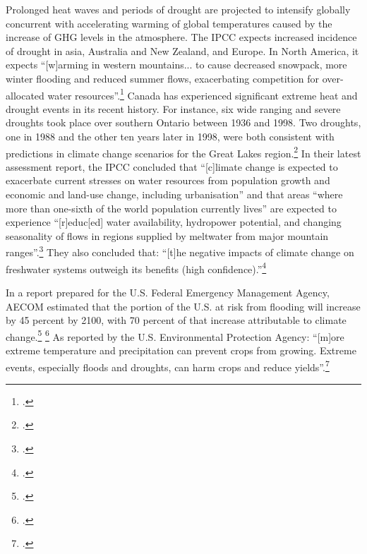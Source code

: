 Prolonged heat waves and periods of drought are projected to intensify globally concurrent with accelerating warming of global temperatures caused by the increase of GHG levels in the atmosphere.
The IPCC expects increased incidence of drought in asia, Australia and New Zealand, and Europe.
In North America, it expects ``[w]arming in western mountains... to cause decreased snowpack, more winter flooding and reduced summer flows, exacerbating competition for over-allocated water resources''.\footcite[][See: Synthesis report, Table SPM.2. Examples of some projected regional impacts. \url{https://www.ipcc.ch/publications_and_data/ar4/syr/en/spms3.html}]{IPCC2007}
Canada has experienced significant extreme heat and drought events in its recent history. 
For instance, six wide ranging and severe droughts took place over southern Ontario between 1936 and 1998. 
Two droughts, one in 1988 and the other ten years later in 1998, were both consistent with predictions in climate change scenarios for the Great Lakes region.\footcite[][]{Koshida2005}
In their latest assessment report, the IPCC concluded that ``[c]limate change is expected to exacerbate current stresses on water resources from population growth and economic and land-use change, including urbanisation'' and that areas ``where more than one-sixth of the world population currently lives'' are expected to experience ``[r]educ[ed] water availability, hydropower potential, and changing seasonality of flows in regions supplied by meltwater from major mountain ranges''.\footcite[][p. 49]{IPCCar4_syr}
They also concluded that: ``[t]he negative impacts of climate change on freshwater systems outweigh its benefits (high confidence).''\footcite[][p. 49]{IPCCar4_syr}



In a report prepared for the U.S. Federal Emergency Management Agency, AECOM estimated that the portion of the U.S. at risk from flooding will increase by 45 percent by 2100, with 70 percent of that increase attributable to climate change.\footcite[][p. ES-7]{FEMAFlood} \footcite[See also: ][]{MJFlood}
As reported by the U.S. Environmental Protection Agency: ``[m]ore extreme temperature and precipitation can prevent crops from growing. Extreme events, especially floods and droughts, can harm crops and reduce yields''.\footcite[][]{EPAAgFoodImpacts}



